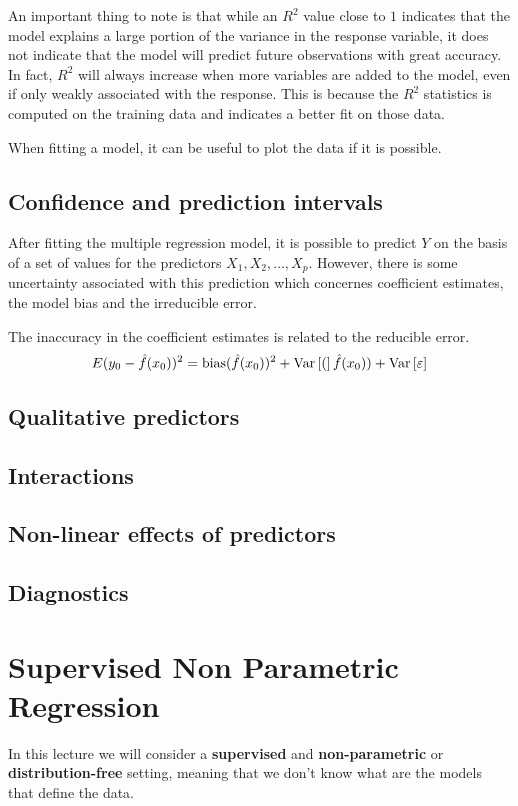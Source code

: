 An important thing to note is that while an $R^2$ value close to $1$ indicates that the model explains a large portion of the variance in the response variable, it does not indicate that the model will predict future observations with great accuracy. In fact, $R^2$ will always increase when more variables are added to the model, even if only weakly associated with the response. This is because the $R^2$ statistics is computed on the training data and indicates a better fit on those data.

When fitting a model, it can be useful to plot the data if it is possible.

\subsection*{Confidence and prediction intervals}
After fitting the multiple regression model, it is possible to predict $Y$ on the basis of a set of values for the predictors $X_1, X_2, \dots, X_p$. However, there is some uncertainty associated with this prediction which concernes coefficient estimates, the model bias and the irreducible error.

The inaccuracy in the coefficient estimates is related to the reducible error.
\[
    E(y_0 - \hat{f}(x_0))^2 = \text{bias}(\hat{f}(x_0))^2 + \text{Var}\left[(\right]\hat{f}(x_0)) + \text{Var}\left[\varepsilon\right]
\]



\subsection*{Qualitative predictors}

\subsection*{Interactions}

\subsection*{Non-linear effects of predictors}

\subsection*{Diagnostics}

\newpage
\section{Supervised Non Parametric Regression}
In this lecture we will consider a \textbf{supervised} and \textbf{non-parametric} or \textbf{distribution-free} setting, meaning that we don't know what are the models that define the data.

